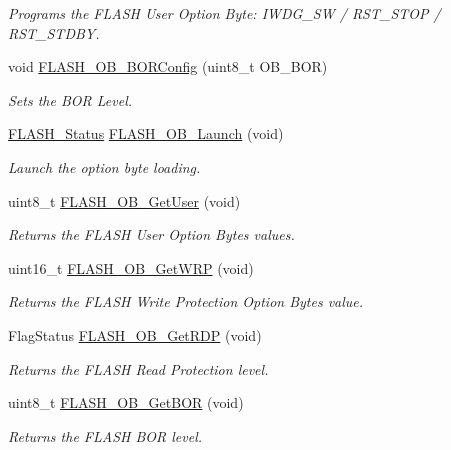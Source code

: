 \begin{DoxyCompactItemize}
\begin{DoxyCompactList}\small\item\em Programs the F\-L\-A\-S\-H User Option Byte\-: I\-W\-D\-G\-\_\-\-S\-W / R\-S\-T\-\_\-\-S\-T\-O\-P / R\-S\-T\-\_\-\-S\-T\-D\-B\-Y. \end{DoxyCompactList}\item 
void \hyperlink{group___f_l_a_s_h___group3_ga621bf052bc381c7a37fb1f8758f5ec2e}{F\-L\-A\-S\-H\-\_\-\-O\-B\-\_\-\-B\-O\-R\-Config} (uint8\-\_\-t O\-B\-\_\-\-B\-O\-R)
\begin{DoxyCompactList}\small\item\em Sets the B\-O\-R Level. \end{DoxyCompactList}\item 
\hyperlink{group___f_l_a_s_h_gadc63a6f3404ff1f71229a66915e9cdc0}{F\-L\-A\-S\-H\-\_\-\-Status} \hyperlink{group___f_l_a_s_h___group3_gabcbd44a62a2488d8b90aa8562a258ef1}{F\-L\-A\-S\-H\-\_\-\-O\-B\-\_\-\-Launch} (void)
\begin{DoxyCompactList}\small\item\em Launch the option byte loading. \end{DoxyCompactList}\item 
uint8\-\_\-t \hyperlink{group___f_l_a_s_h___group3_ga737dd808489113af7f8df7f7e9f7baae}{F\-L\-A\-S\-H\-\_\-\-O\-B\-\_\-\-Get\-User} (void)
\begin{DoxyCompactList}\small\item\em Returns the F\-L\-A\-S\-H User Option Bytes values. \end{DoxyCompactList}\item 
uint16\-\_\-t \hyperlink{group___f_l_a_s_h___group3_gafa2aec5fa1ea7a73c31f3405f465c525}{F\-L\-A\-S\-H\-\_\-\-O\-B\-\_\-\-Get\-W\-R\-P} (void)
\begin{DoxyCompactList}\small\item\em Returns the F\-L\-A\-S\-H Write Protection Option Bytes value. \end{DoxyCompactList}\item 
Flag\-Status \hyperlink{group___f_l_a_s_h___group3_ga2f0151c6c923396eaf96c554a5860c31}{F\-L\-A\-S\-H\-\_\-\-O\-B\-\_\-\-Get\-R\-D\-P} (void)
\begin{DoxyCompactList}\small\item\em Returns the F\-L\-A\-S\-H Read Protection level. \end{DoxyCompactList}\item 
uint8\-\_\-t \hyperlink{group___f_l_a_s_h___group3_gab8a8804905929b2edd544d28c2e7b215}{F\-L\-A\-S\-H\-\_\-\-O\-B\-\_\-\-Get\-B\-O\-R} (void)
\begin{DoxyCompactList}\small\item\em Returns the F\-L\-A\-S\-H B\-O\-R level. \end{DoxyCompactList}\end{DoxyCompactItemize}


